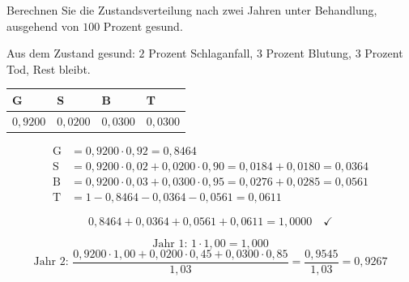 \begin{aufgabe}
Berechnen Sie die Zustandsverteilung nach zwei Jahren unter Behandlung, ausgehend von $100$ Prozent gesund.

\loesung
{}
Aus dem Zustand gesund: $2$ Prozent Schlaganfall, $3$ Prozent Blutung, $3$ Prozent Tod, Rest bleibt.
\begin{center}
{\small
\renewcommand{\arraystretch}{1.46}
\begin{tabular}{@{}P{2.0cm}P{2.0cm}P{2.0cm}P{1.8cm}@{}}
\toprule
\textbf{G} & \textbf{S} & \textbf{B} & \textbf{T}\\
\midrule
$0{,}9200$ & $0{,}0200$ & $0{,}0300$ & $0{,}0300$\\
\bottomrule
\end{tabular}}
\end{center}

\begin{align*}
\text{G} &= 0{,}9200\cdot0{,}92 = 0{,}8464\\
\text{S} &= 0{,}9200\cdot0{,}02 + 0{,}0200\cdot0{,}90 = 0{,}0184+0{,}0180 = 0{,}0364\\
\text{B} &= 0{,}9200\cdot0{,}03 + 0{,}0300\cdot0{,}95 = 0{,}0276+0{,}0285 = 0{,}0561\\
\text{T} &= 1 - 0{,}8464-0{,}0364-0{,}0561 = 0{,}0611
\end{align*}

\[ 0{,}8464+0{,}0364+0{,}0561+0{,}0611 = 1{,}0000 \quad \checkmark \]

\[ \text{Jahr 1: } 1\cdot1{,}00 = 1{,}000 \]
\[ \text{Jahr 2: } \frac{0{,}9200\cdot1{,}00 + 0{,}0200\cdot0{,}45 + 0{,}0300\cdot0{,}85}{1{,}03} = \frac{0{,}9545}{1{,}03} = 0{,}9267 \]

\begin{center}
\begin{minipage}{0.88\textwidth}
\end{minipage}
\end{center}
\end{aufgabe}


